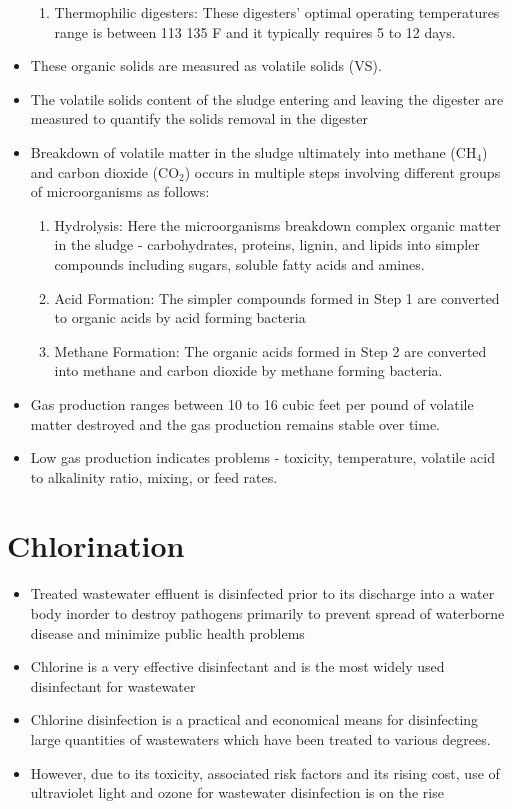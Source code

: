 \documentclass{article}
\begin{document}
\begin{itemize}
\begin{enumerate}[1. ]
			\item Thermophilic digesters:  These digesters’ optimal operating temperatures range is between 113   135 F and it typically requires 5 to 12 days.\\
			\end{enumerate}     
		\item These organic solids are measured as volatile solids (VS).  
		\item The volatile solids content of the sludge entering and leaving the digester are measured to quantify the solids removal in the digester
		 \item Breakdown of volatile matter in the sludge ultimately into methane (CH$_4$) and carbon dioxide (CO$_2$) occurs in multiple steps involving different groups of microorganisms as follows:\\
			\begin{enumerate}[Step 1.]
			\item Hydrolysis:  Here the microorganisms breakdown complex organic matter in the sludge - carbohydrates, proteins, lignin, and lipids into simpler compounds including sugars, soluble fatty acids and amines.\\
			\item Acid Formation:  The simpler compounds formed in Step 1 are converted to organic acids by acid forming bacteria\\
			\item Methane Formation: The organic acids formed in Step 2 are converted into methane and carbon dioxide by methane forming bacteria.\\
			\end{enumerate}
		\item Gas production ranges between 10 to 16 cubic feet per pound of volatile matter destroyed and the gas production remains stable over time.
		\item Low gas production indicates problems - toxicity, temperature, volatile acid to alkalinity ratio, mixing, or feed rates.
		\end{itemize}

\newpage
\section{Chlorination}


\begin{itemize}
\item Treated wastewater effluent is disinfected prior to its discharge into a water body inorder to destroy pathogens primarily to prevent spread of waterborne disease and minimize public health problems
\item Chlorine is a very effective disinfectant and is the most widely used disinfectant for wastewater 
\item Chlorine disinfection is a practical and economical means for disinfecting large quantities of wastewaters which have been treated to various degrees. 
\item However, due to its toxicity, associated risk factors and its rising cost, use of ultraviolet light and ozone for wastewater disinfection is on the rise
\end{itemize}
\end{document}
